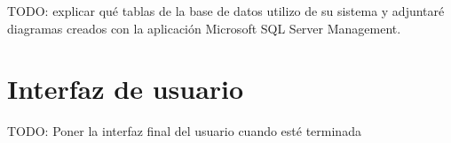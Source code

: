 TODO: explicar qué tablas de la base de datos utilizo de su sistema y adjuntaré  diagramas creados con la aplicación Microsoft SQL Server Management. \\



\section{Interfaz de usuario}


TODO: Poner la interfaz final del usuario cuando esté terminada

